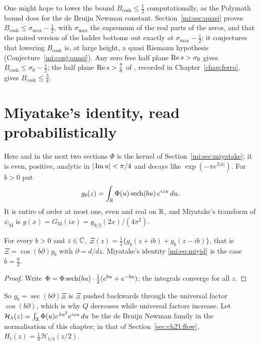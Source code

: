 One might hope to lower the bound $B_{\cosh}\le\frac12$ computationally, as the Polymath bound \cite{Polymath} does for the de Bruijn Newman constant. Section~\ref{mi:sec:quasi} proves $B_{\cosh}\le\sigma_{\max}-\frac12$, with $\sigma_{\max}$ the supremum of the real parts of the zeros, and that the paired version of the ladder bottoms out exactly at $\sigma_{\max}-\frac12$; it conjectures that lowering $B_{\cosh}$ is, at large height, a quasi Riemann hypothesis (Conjecture~\ref{mi:conj:quasi}). Any zero free half plane $\operatorname{Re} s>\sigma_0$ gives $B_{\cosh}\le\sigma_0-\frac12$; the half plane $\operatorname{Re} s>\frac78$ of \cite{OAI26a}, recorded in Chapter~\ref{chap:ferro}, gives $B_{\cosh}\le\frac38$.

\section{Miyatake's identity, read probabilistically}\label{mi:sec:prob}

Here and in the next two sections $\Phi$ is the kernel of Section~\ref{mi:sec:miyatake}; it is even, positive, analytic in $|\operatorname{Im} u|<\pi/4$ and decays like $\exp(-\pi e^{2|u|})$. For $b>0$ put
\[
g_b(z)=\int_{\mathbb{R}}\Phi(u)\operatorname{sech}(bu)\,e^{izu}\,du .
\]
It is entire of order at most one, even and real on $\mathbb{R}$, and Miyatake's transform of $\psi_{\mathrm M}$ is $g(x)=G_{\mathrm M}(ix)=g_{9/2}(2x)/(4\pi^2)$.

\begin{proposition}\label{mi:prop:shiftb}
For every $b>0$ and $z\in\mathbb{C}$, $\Xi(z)=\frac12\{g_b(z+ib)+g_b(z-ib)\}$, that is $\Xi=\cos(b\partial)g_b$ with $\partial=d/dz$. Miyatake's identity \eqref{mi:eq:miyid} is the case $b=\frac92$.
\end{proposition}

\begin{proof}
Write $\Phi=\Phi\operatorname{sech}(bu)\cdot\frac12(e^{bu}+e^{-bu})$; the integrals converge for all $z$.
\end{proof}

So $g_b=\sec(b\partial)\Xi$ is $\Xi$ pushed backwards through the universal factor $\cos(b\partial)$, which is why $Q$ decreases while universal factors increase. Let $\mathcal H_\lambda(z)=\int_{\mathbb{R}}\Phi(u)e^{\lambda u^2}e^{izu}\,du$ be the de Bruijn Newman family in the normalisation of this chapter; in that of Section~\ref{sec:ch21:flow}, $H_t(z)=\frac18\mathcal H_{t/4}(z/2)$.

